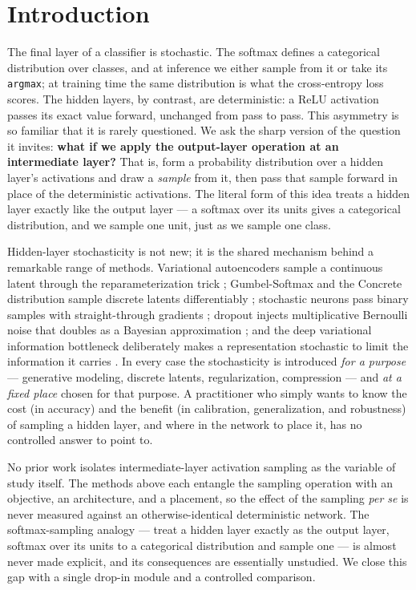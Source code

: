 \section{Introduction}\label{sec:intro}

The final layer of a classifier is stochastic. The softmax defines a categorical distribution over classes, and at inference we either sample from it or take its \texttt{argmax}; at training time the same distribution is what the cross-entropy loss scores. The hidden layers, by contrast, are deterministic: a ReLU activation passes its exact value forward, unchanged from pass to pass. This asymmetry is so familiar that it is rarely questioned. We ask the sharp version of the question it invites: {\bf what if we apply the output-layer operation at an intermediate layer?} That is, form a probability distribution over a hidden layer's activations and draw a \emph{sample} from it, then pass that sample forward in place of the deterministic activations. The literal form of this idea treats a hidden layer exactly like the output layer --- a softmax over its units gives a categorical distribution, and we sample one unit, just as we sample one class.

Hidden-layer stochasticity is not new; it is the shared mechanism behind a remarkable range of methods. Variational autoencoders sample a continuous latent through the reparameterization trick \citep{kingma2014vae,rezende2014stochastic}; Gumbel-Softmax and the Concrete distribution sample discrete latents differentiably \citep{jang2017gumbel,maddison2017concrete}; stochastic neurons pass binary samples with straight-through gradients \citep{bengio2013stochastic}; dropout injects multiplicative Bernoulli noise that doubles as a Bayesian approximation \citep{srivastava2014dropout,gal2016dropout}; and the deep variational information bottleneck deliberately makes a representation stochastic to limit the information it carries \citep{alemi2017deepvib,tishby2015deep}. In every case the stochasticity is introduced \emph{for a purpose} --- generative modeling, discrete latents, regularization, compression --- and \emph{at a fixed place} chosen for that purpose. A practitioner who simply wants to know the cost (in accuracy) and the benefit (in calibration, generalization, and robustness) of sampling a hidden layer, and where in the network to place it, has no controlled answer to point to.

 No prior work isolates intermediate-layer activation sampling as the variable of study itself. The methods above each entangle the sampling operation with an objective, an architecture, and a placement, so the effect of the sampling \emph{per se} is never measured against an otherwise-identical deterministic network. The softmax-sampling analogy --- treat a hidden layer exactly as the output layer, softmax over its units to a categorical distribution and sample one --- is almost never made explicit, and its consequences are essentially unstudied. We close this gap with a single drop-in module and a controlled comparison.

